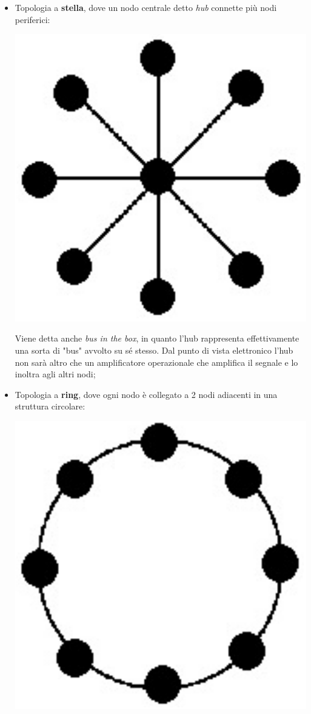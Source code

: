 \documentclass[a4paper,11pt]{article}
\begin{document}
\begin{itemize}
	\item 
		Topologia a \textbf{stella}, dove un nodo centrale detto \textit{hub} connette più nodi periferici:
		\begin{center}
			\includegraphics[scale=0.11]{../figures/star.png}
		\end{center}
		Viene detta anche \textit{bus in the box}, in quanto l'hub rappresenta effettivamente una sorta di "bus" avvolto su sé stesso. Dal punto di vista elettronico l'hub non sarà altro che un amplificatore operazionale che amplifica il segnale e lo inoltra agli altri nodi;
	\item Topologia a \textbf{ring}, dove ogni nodo è collegato a 2 nodi adiacenti in una struttura circolare:
		\begin{center}
			\includegraphics[scale=0.11]{../figures/ring.png}

\end{center}
\end{itemize}
\end{document}
